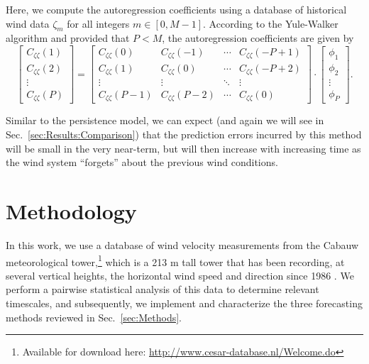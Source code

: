 \documentclass[11pt, oneside]{article}
\newcommand{\secref}[1]{Sec.~\ref{#1}}
\begin{document}
Here, we compute the autoregression coefficients using a database of historical wind data $\zeta_m$ for all integers $m \in [0, M-1]$.
According to the Yule-Walker algorithm and provided that $P < M$, the autoregression coefficients are given by \citep[Sec.~3.1.1]{Chatfield2000}
\begin{equation}
\begin{bmatrix}
C_{\zeta \zeta}(1) \\
C_{\zeta \zeta}(2) \\
\vdots \\
C_{\zeta \zeta}(P)
\end{bmatrix}
=
\begin{bmatrix}
C_{\zeta \zeta}(0) & C_{\zeta \zeta}(-1) & \cdots & C_{\zeta \zeta} (-P+1) \\
C_{\zeta \zeta}(1) & C_{\zeta \zeta}(0) & \cdots & C_{\zeta \zeta} (-P+2) \\
\vdots & \vdots & \ddots & \vdots \\
C_{\zeta \zeta}(P-1) & C_{\zeta \zeta}(P-2) & \cdots & C_{\zeta \zeta}(0)
\end{bmatrix}
\cdot
\begin{bmatrix}
\phi_1 \\
\phi_2 \\
\vdots \\
\phi_P
\end{bmatrix}.
\end{equation}

Similar to the persistence model, we can expect (and again we will see in \secref{sec:Results:Comparison}) that the prediction errors incurred by this method will be small in the very near-term, but will then increase with increasing time as the wind system ``forgets'' about the previous wind conditions.

\section{Methodology}\label{sec:Methodology}
In this work, we use a database of wind velocity measurements from the Cabauw meteorological tower,\footnote{Available for download here: \url{http://www.cesar-database.nl/Welcome.do}} which is a 213 m tall tower that has been recording, at several vertical heights, the horizontal wind speed and direction since 1986 \citep[Table I]{VanUldenWieringa1996}. %
We perform a pairwise statistical analysis of this data to determine relevant timescales, and
subsequently, we implement and characterize the three forecasting methods reviewed in \secref{sec:Methods}.
\end{document}
